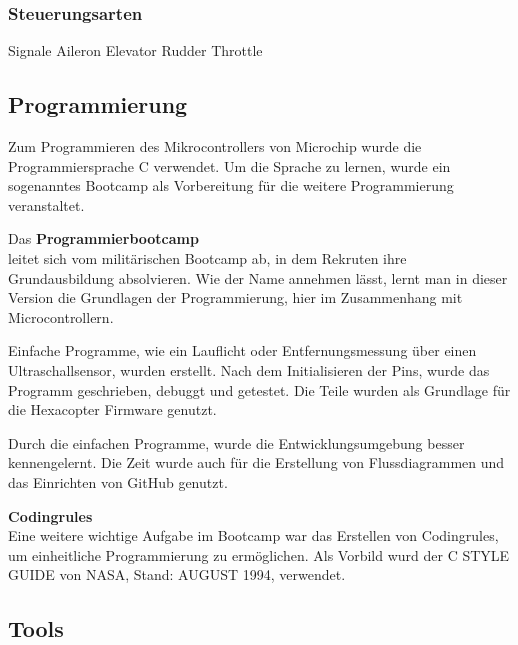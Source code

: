 \begin{itemize}

  \subsubsection{Steuerungsarten} %
  Signale
  Aileron
  Elevator
  Rudder
  Throttle


\subsection{Programmierung}
  
  Zum Programmieren des Mikrocontrollers von Microchip wurde die Programmiersprache C verwendet.
  Um die Sprache zu lernen, wurde ein sogenanntes Bootcamp als Vorbereitung für die weitere Programmierung veranstaltet.

  Das \textbf{Programmierbootcamp}\\ leitet sich vom militärischen Bootcamp ab, in dem Rekruten ihre Grundausbildung absolvieren. Wie der Name annehmen lässt, lernt man in dieser Version die Grundlagen der Programmierung, hier im Zusammenhang mit Microcontrollern. 

  Einfache Programme, wie ein Lauflicht oder Entfernungsmessung über einen Ultraschallsensor, wurden erstellt.
  Nach dem Initialisieren der Pins, wurde das Programm geschrieben, debuggt und getestet. 
  Die Teile wurden als Grundlage für die Hexacopter Firmware genutzt.

  Durch die einfachen Programme, wurde die Entwicklungsumgebung besser kennengelernt. Die Zeit wurde auch für die Erstellung von Flussdiagrammen und das Einrichten von GitHub genutzt.

  \textbf{Codingrules}\\
  Eine weitere wichtige Aufgabe im Bootcamp war das Erstellen von Codingrules, um einheitliche Programmierung zu ermöglichen. 
  Als Vorbild wurd der C STYLE GUIDE von NASA, Stand: AUGUST 1994, verwendet. \cite{NasaCGuide}
  
  \subsection{Tools}


\end{itemize}

